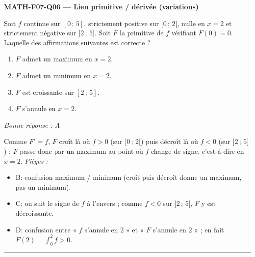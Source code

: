 \documentclass[11pt,a4paper]{article}
\begin{document}
\noindent\textbf{MATH-F07-Q06 --- Lien primitive / dérivée (variations)}\par
Soit $f$ continue sur $[0\,;\,5]$, strictement positive sur $[0\,;\,2[$, nulle en $x=2$ et strictement négative sur $]2\,;\,5]$. Soit $F$ la primitive de $f$ vérifiant $F(0)=0$. Laquelle des affirmations suivantes est correcte ?
\begin{enumerate}[label=\Alph*)]
\item $F$ admet un maximum en $x=2$.
\item $F$ admet un minimum en $x=2$.
\item $F$ est croissante sur $[2\,;\,5]$.
\item $F$ s'annule en $x=2$.
\end{enumerate}
\textit{Bonne réponse : A}\par
Comme $F'=f$, $F$ croît là où $f>0$ (sur $[0\,;\,2[$) puis décroît là où $f<0$ (sur $]2\,;\,5]$) : $F$ passe donc par un maximum au point où $f$ change de signe, c'est-à-dire en $x=2$.
\textit{Pièges :}
\begin{itemize}
\item B: confusion maximum / minimum (croît puis décroît donne un maximum, pas un minimum).
\item C: on suit le signe de $f$ à l'envers ; comme $f<0$ sur $]2\,;\,5]$, $F$ y est décroissante.
\item D: confusion entre « $f$ s'annule en $2$ » et « $F$ s'annule en $2$ » ; en fait $F(2)=\int_{0}^{2} f>0$.
\end{itemize}
\vspace{8pt}\hrule\vspace{8pt}
\end{document}
